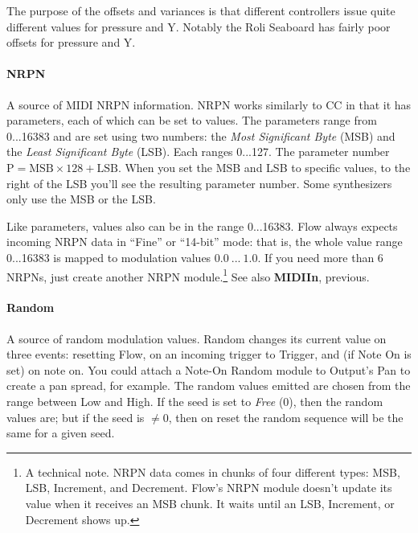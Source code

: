 \documentclass{article}
\newcommand\name{Flow}
\begin{document}
The purpose of the offsets and variances is that different controllers issue quite different values for pressure and Y.  Notably the Roli Seaboard has fairly poor offsets for pressure and Y.

\paragraph{NRPN}  A source of MIDI NRPN information.  NRPN works similarly to CC in that it has parameters, each of which can be set to values.  The parameters range from 0...16383 and are set using two numbers: the {\it Most Significant Byte} (MSB) and the {\it Least Significant Byte} (LSB).  Each ranges 0...127.  The parameter number \(\text{P} = \text{MSB} \times 128 + \text{LSB}\).  When you set the MSB and LSB to specific values, to the right of the LSB you'll see the resulting parameter number.  Some synthesizers only use the MSB or the LSB.  

Like parameters, values also can be in the range 0...16383.  {\name} always expects incoming NRPN data in ``Fine'' or ``14-bit'' mode: that is, the whole value range 0...16383 is mapped to modulation values \(0.0\ ...\ 1.0\).  If you need more than 6 NRPNs, just create another NRPN module.\footnote{A technical note.  NRPN data comes in chunks of four different types: MSB, LSB, Increment, and Decrement.  Flow's NRPN module doesn't update its value when it receives an MSB chunk.  It waits until an LSB, Increment, or Decrement shows up.}  See also {\bf MIDIIn}, previous.

\paragraph{Random}  A source of random modulation values.  Random changes its current value on three events: resetting {\name}, on an incoming trigger to Trigger, and (if Note On is set) on note on.  You could attach a Note-On Random module to Output's Pan to create a pan spread, for example.  The random values emitted are chosen from the range between Low and High.    If the seed is set to {\it Free} (0), then the random values are; but if the seed is \(\neq 0\), then on reset the random sequence will be the same for a given seed. 

\end{document}
